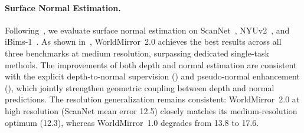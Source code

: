 \documentclass{article} %
\begin{document}
\begin{table}[t]
\begin{minipage}[t]{0.522\textwidth}
{\begin{tabular}{lcccc}
  \end{tabular}
  }
  \end{minipage}
  \hfill
  \begin{minipage}[t]{0.468\textwidth}
  \centering
  \end{minipage}
  \label{tab:wm_pose_depth_nvs}
  \end{table}

\paragraph{Surface Normal Estimation.}
Following~\cite{bae2024rethinking}, we evaluate surface normal estimation on ScanNet~\cite{dai2017scannet}, NYUv2~\cite{silberman2012indoor}, and iBims-1~\cite{koch2018evaluation}. As shown in~, WorldMirror~2.0 achieves the best results across all three benchmarks at medium resolution, surpassing dedicated single-task methods. The improvements of both depth and normal estimation are consistent with the explicit depth-to-normal supervision () and pseudo-normal enhancement (), which jointly strengthen geometric coupling between depth and normal predictions. 
The resolution generalization remains consistent: WorldMirror~2.0 at high resolution (ScanNet mean error 12.5) closely matches its medium-resolution optimum (12.3), whereas WorldMirror~1.0 degrades from 13.8 to 17.6.
\end{document}
